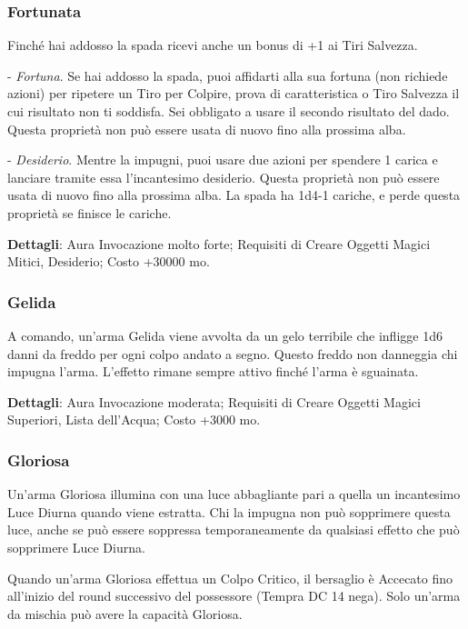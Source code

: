 \begin{multicols}{2}
	\subsubsection*{Fortunata}

	Finché hai addosso la spada ricevi anche un bonus di +1 ai Tiri Salvezza.

	- \textit{Fortuna}. Se hai addosso la spada, puoi affidarti alla sua fortuna (non richiede azioni) per ripetere un Tiro per Colpire, prova di caratteristica o Tiro Salvezza il cui risultato non ti soddisfa. Sei obbligato a usare il secondo risultato del dado. Questa proprietà non può essere usata di nuovo fino alla prossima alba.

	- \textit{Desiderio}. Mentre la impugni, puoi usare due azioni per spendere 1 carica e lanciare tramite essa l'incantesimo desiderio. Questa proprietà non può essere usata di nuovo fino alla prossima alba. La spada ha 1d4-1 cariche, e perde questa proprietà se finisce le cariche.

	\textbf{Dettagli}: Aura Invocazione molto forte; Requisiti di Creare Oggetti Magici Mitici, Desiderio; Costo +30000 mo.

	\subsubsection*{Gelida}

	A comando, un'arma Gelida viene avvolta da un gelo terribile che infligge 1d6 danni da freddo per ogni colpo andato a segno. Questo freddo non danneggia chi impugna l'arma. L'effetto rimane sempre attivo finché l'arma è sguainata.

	\textbf{Dettagli}: Aura Invocazione moderata; Requisiti di Creare Oggetti Magici Superiori, Lista dell'Acqua; Costo +3000 mo.

	\subsubsection*{Gloriosa}

	Un'arma Gloriosa illumina con una luce abbagliante pari a quella un incantesimo Luce Diurna quando viene estratta. Chi la impugna non può sopprimere questa luce, anche se può essere soppressa temporaneamente da qualsiasi effetto che può sopprimere Luce Diurna.

	Quando un'arma Gloriosa effettua un Colpo Critico, il bersaglio è Accecato fino all'inizio del round successivo del possessore (Tempra DC 14 nega). Solo un'arma da mischia può avere la capacità Gloriosa.


\end{multicols}
